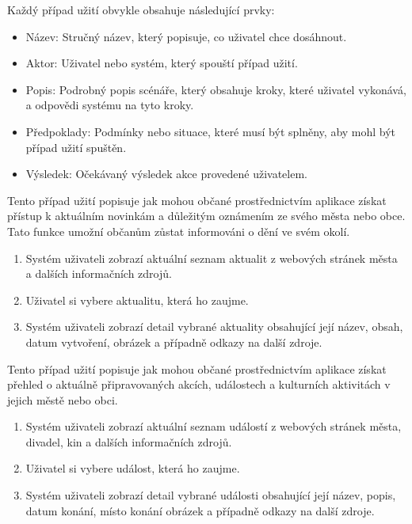 Každý případ užití obvykle obsahuje následující prvky:

\begin{itemize}
  \item Název: Stručný název, který popisuje, co uživatel chce dosáhnout.
  \item Aktor: Uživatel nebo systém, který spouští případ užití.
  \item Popis: Podrobný popis scénáře, který obsahuje kroky, které uživatel vykonává, a odpovědi systému na tyto kroky.
  \item Předpoklady: Podmínky nebo situace, které musí být splněny, aby mohl být případ užití spuštěn.
  \item Výsledek: Očekávaný výsledek akce provedené uživatelem.
\end{itemize}

Tento případ užití popisuje jak mohou občané prostřednictvím aplikace získat přístup k aktuálním novinkám a důležitým oznámením ze svého města 
nebo obce. Tato funkce umožní občanům zůstat informováni o dění ve svém okolí.

\begin{enumerate}
  \item Systém uživateli zobrazí aktuální seznam aktualit z webových stránek města a dalších informačních zdrojů.
  \item Uživatel si vybere aktualitu, která ho zaujme.
  \item Systém uživateli zobrazí detail vybrané aktuality obsahující její název, obsah, datum vytvoření, obrázek a případně odkazy na další zdroje.
\end{enumerate}

Tento případ užití popisuje jak mohou občané prostřednictvím aplikace získat přehled o aktuálně připravovaných akcích, událostech a kulturních 
aktivitách v jejich městě nebo obci. 

\begin{enumerate}
  \item Systém uživateli zobrazí aktuální seznam událostí z webových stránek města, divadel, kin a dalších informačních zdrojů.
  \item Uživatel si vybere událost, která ho zaujme.
  \item Systém uživateli zobrazí detail vybrané události obsahující její název, popis, datum konání, místo konání obrázek a případně odkazy na další zdroje.
\end{enumerate}

